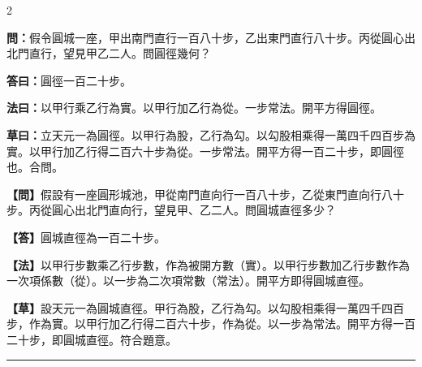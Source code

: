 \documentclass[11pt,a4paper]{article}
\newcommand{\longline}{\noindent\rule{\textwidth}{0.4pt}}
\newcommand{\wenC}[1]{\par\noindent\textbf{\textcolor{probcolor}{問：}}{#1}\par}
\newcommand{\daC}[1]{\par\noindent\textbf{\textcolor{anscolor}{答曰：}}{#1}\par}
\newcommand{\fayueC}[1]{\par\noindent\textbf{\textcolor{methodcolor}{法曰：}}{#1}\par}
\newcommand{\caoyueC}[1]{\par\noindent\textbf{草曰：}{#1}\par}
\newcommand{\wenM}[1]{\par\noindent\textbf{\textcolor{probcolor}{【問】}}{#1}\par}
\newcommand{\daM}[1]{\par\noindent\textbf{\textcolor{anscolor}{【答】}}{#1}\par}
\newcommand{\fayueM}[1]{\par\noindent\textbf{\textcolor{methodcolor}{【法】}}{#1}\par}
\newcommand{\caoyueM}[1]{\par\noindent\textbf{【草】}{#1}\par}
\begin{document}
\begin{paracol}{2}

\wenC{假令圓城一座，甲出南門直行一百八十步，乙出東門直行八十步。丙從圓心出北門直行，望見甲乙二人。問圓徑幾何？}

\daC{圓徑一百二十步。}

\fayueC{以甲行乘乙行為實。以甲行加乙行為從。一步常法。開平方得圓徑。}

\caoyueC{立天元一為圓徑。以甲行為股，乙行為勾。以勾股相乘得一萬四千四百步為實。以甲行加乙行得二百六十步為從。一步常法。開平方得一百二十步，即圓徑也。合問。}

\switchcolumn

\wenM{假設有一座圓形城池，甲從南門直向行一百八十步，乙從東門直向行八十步。丙從圓心出北門直向行，望見甲、乙二人。問圓城直徑多少？}

\daM{圓城直徑為一百二十步。}

\fayueM{以甲行步數乘乙行步數，作為被開方數（實）。以甲行步數加乙行步數作為一次項係數（從）。以一步為二次項常數（常法）。開平方即得圓城直徑。}

\caoyueM{設天元一為圓城直徑。甲行為股，乙行為勾。以勾股相乘得一萬四千四百步，作為實。以甲行加乙行得二百六十步，作為從。以一步為常法。開平方得一百二十步，即圓城直徑。符合題意。}

\end{paracol}

\vspace{0.3cm}
\longline
\end{document}
